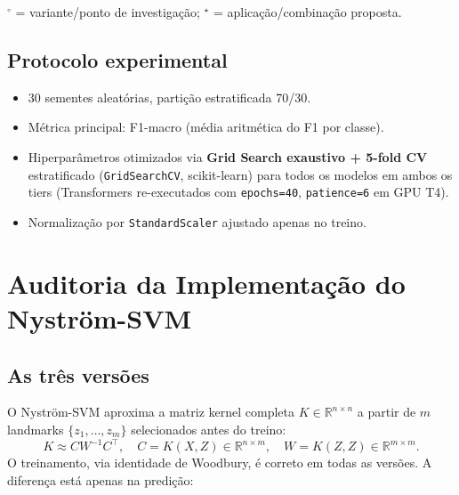 \documentclass[12pt,a4paper]{article}
\begin{document}
\noindent$^\circ$ = variante/ponto de investigação;
$^\star$ = aplicação/combinação proposta.

\subsection*{Protocolo experimental}

\begin{itemize}
  \item 30 sementes aleatórias, partição estratificada 70/30.
  \item Métrica principal: F1-macro (média aritmética do F1 por classe).
  \item Hiperparâmetros otimizados via \textbf{Grid Search exaustivo + 5-fold CV}
        estratificado (\texttt{GridSearchCV}, scikit-learn) para todos os modelos
        em ambos os tiers (Transformers re-executados com \texttt{epochs=40}, \texttt{patience=6}
        em GPU T4).
  \item Normalização por \texttt{StandardScaler} ajustado apenas no treino.
\end{itemize}

\section{Auditoria da Implementação do Nyström-SVM}
\label{sec:nystrom_fix}

\subsection{As três versões}

O Nyström-SVM aproxima a matriz kernel completa $K \in \mathbb{R}^{n \times n}$
a partir de $m$ landmarks $\{z_1, \ldots, z_m\}$ selecionados antes do treino:
\[
  K \approx C W^{-1} C^\top, \quad C = K(X, Z) \in \mathbb{R}^{n \times m},
  \quad W = K(Z, Z) \in \mathbb{R}^{m \times m}.
\]
O treinamento, via identidade de Woodbury, é correto em todas as versões.
A diferença está apenas na predição:
\end{document}

